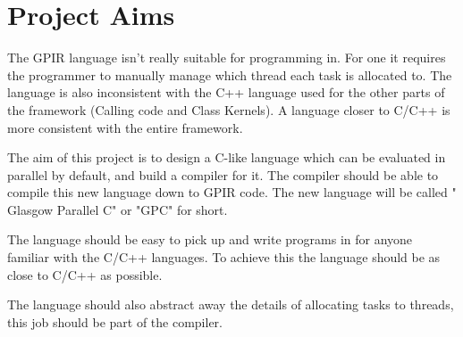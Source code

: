 \section{Project Aims}

The GPIR language isn't really suitable for programming in. For one it requires the programmer to manually
manage which thread each task is allocated to. The language is also inconsistent with the C++ language used for 
the other parts of the framework (Calling code and Class Kernels). A language closer to C/C++ is more
consistent with the entire framework.

The aim of this project is to design a C-like language which can be evaluated in parallel by default, and build
a compiler for it. The compiler should be able to compile this new language down to GPIR code. The new language will
be called " Glasgow Parallel C" or "GPC" for short.

The language should be easy to pick up and write programs in for anyone familiar with the C/C++ languages.
To achieve this the language should be as close to C/C++ as possible. 

The language should also abstract away the details of allocating tasks to threads, this job
should be part of the compiler.

